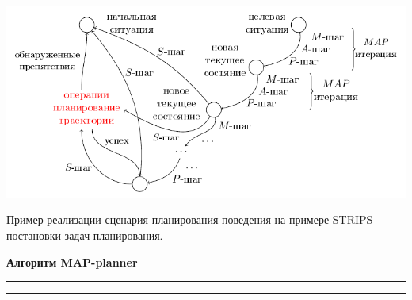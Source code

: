 \documentclass[preview,border=10pt]{standalone}
\begin{document}
	\begin{center}
		\includegraphics[width=\textwidth]{../images/algo/ru/beh_plan_ru}
	\end{center}
	
	Пример реализации сценария планирования поведения на примере STRIPS постановки задач планирования.
	
	\textbf{Алгоритм MAP-planner}
	\vspace*{2pt}
	\hrule
	\vspace*{1pt}
	\hrule
		
	\begin{algorithmic}[1]
		
		
	\end{algorithmic}
\end{document}
